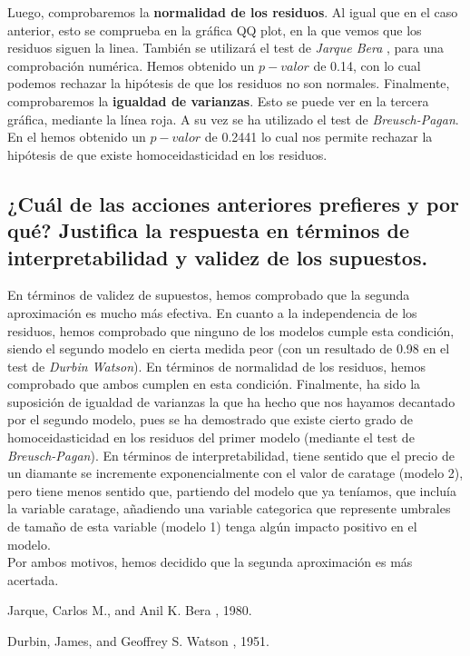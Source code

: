 \documentclass[a4paper, 7pt]{article}
\begin{document}
Luego, comprobaremos la \textbf{normalidad de los residuos}. Al igual que en el caso anterior, esto se comprueba en la gráfica QQ plot, en la que vemos que los residuos siguen la linea. También se utilizará el test de \textit{Jarque Bera} \cite{jarquebera}, para una comprobación numérica. Hemos obtenido un $p-valor$ de 0.14, con lo cual podemos rechazar la hipótesis de que los residuos no son normales. Finalmente, comprobaremos la \textbf{igualdad de varianzas}. Esto se puede ver en la tercera gráfica, mediante la línea roja. A su vez se ha utilizado el test de \textit{Breusch-Pagan}. En el hemos obtenido un $p-valor$ de 0.2441 lo cual nos permite rechazar la hipótesis de que existe homoceidasticidad en los residuos.

\subsection{¿Cuál de las acciones anteriores prefieres y por qué? Justifica la respuesta en términos de interpretabilidad y validez de los supuestos.}
\label{subsec:question-4}

En términos de validez de supuestos, hemos comprobado que la segunda aproximación es mucho más efectiva. En cuanto a la independencia de los residuos, hemos comprobado que ninguno de los modelos cumple esta condición, siendo el segundo modelo en cierta medida peor (con un resultado de 0.98 en el test de \textit{Durbin Watson}). En términos de normalidad de los residuos, hemos comprobado que ambos cumplen en esta condición. Finalmente, ha sido la suposición de igualdad de varianzas la que ha hecho que nos hayamos decantado por el segundo modelo, pues se ha demostrado que existe cierto grado de homoceidasticidad en los residuos del primer modelo (mediante el test de \textit{Breusch-Pagan}). En términos de interpretabilidad, tiene sentido que el precio de un diamante se incremente exponencialmente con el valor de caratage (modelo 2), pero tiene menos sentido que, partiendo del modelo que ya teníamos, que incluía la variable caratage, añadiendo una variable categorica que represente umbrales de tamaño de esta variable (modelo 1) tenga algún impacto positivo en el modelo.\\

Por ambos motivos, hemos decidido que la segunda aproximación es más acertada.

\begin{thebibliography}{9}
    Jarque, Carlos M., and Anil K. Bera
    , 1980.
    
    Durbin, James, and Geoffrey S. Watson
    , 1951.

\end{thebibliography}
\end{document}
